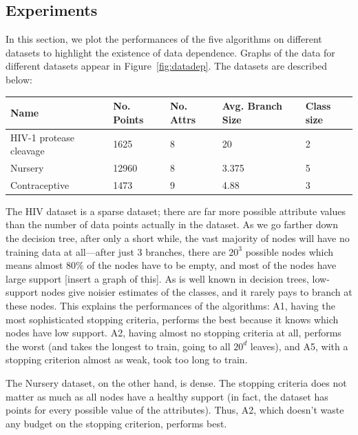 \documentclass[11pt]{report}
\begin{document}
\subsection{Experiments}
In this section, we plot the performances of the five algorithms on different datasets to highlight the existence of data dependence. Graphs of the data for different datasets appear in Figure~\ref{fig:datadep}. The datasets are described below:
\begin{center}
\begin{tabular}{|p{3cm}|l|l|l|l|}
\hline
Name & No. Points & No. Attrs & Avg. Branch Size & Class size \\ \hline
HIV-1 protease cleavage & 1625 & 8 & 20 & 2 \\ \hline
Nursery & 12960 & 8 & 3.375 & 5 \\ \hline
Contraceptive & 1473 & 9 & 4.88 & 3 \\ \hline
\end{tabular}
\end{center}
The HIV dataset is a sparse dataset; there are far more possible attribute values than the number of data points actually in the dataset. As we go farther down the decision tree, after only a short while, the vast majority of nodes will have no training data at all---after just 3 branches, there are $20^3$ possible nodes which means almost $80\%$ of the nodes have to be empty, and most of the nodes have large support [insert a graph of this]. As is well known in decision trees, low-support nodes give noisier estimates of the classes, and it rarely pays to branch at these nodes. This explains the performances of the algorithms: A1, having the most sophisticated stopping criteria, performs the best because it knows which nodes have low support. A2, having almost no stopping criteria at all, performs the worst (and takes the longest to train, going to all $20^d$ leaves), and A5, with a stopping criterion almost as weak, took too long to train.

The Nursery dataset, on the other hand, is dense. The stopping criteria does not matter as much as all nodes have a healthy support (in fact, the dataset has points for every possible value of the attributes). Thus, A2, which doesn't waste any budget on the stopping criterion, performs best.
\end{document}
